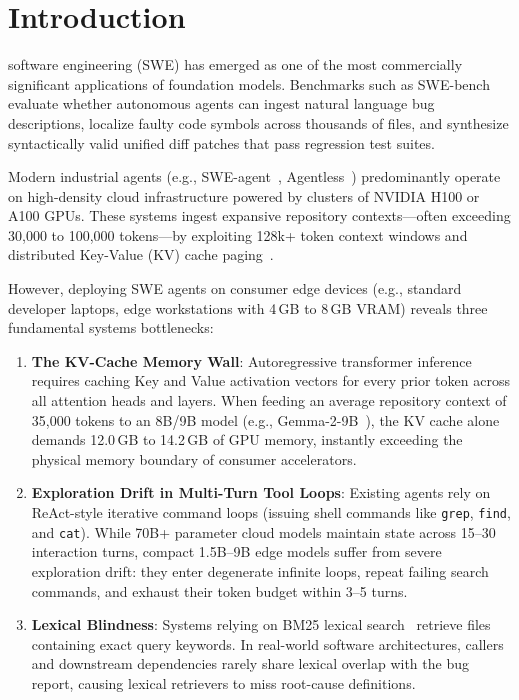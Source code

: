 \documentclass[journal]{IEEEtran}
\begin{document}
\section{Introduction}
\label{sec:intro}

 software engineering (SWE) has emerged as one of the most commercially significant applications of foundation models. Benchmarks such as SWE-bench~\cite{jimenez2024swebench} evaluate whether autonomous agents can ingest natural language bug descriptions, localize faulty code symbols across thousands of files, and synthesize syntactically valid unified diff patches that pass regression test suites.

Modern industrial agents (e.g., SWE-agent~\cite{yang2024sweagent}, Agentless~\cite{xia2024agentless}) predominantly operate on high-density cloud infrastructure powered by clusters of NVIDIA H100 or A100 GPUs. These systems ingest expansive repository contexts---often exceeding 30,000 to 100,000 tokens---by exploiting 128k+ token context windows and distributed Key-Value (KV) cache paging~\cite{kwon2023vllm}.

However, deploying SWE agents on consumer edge devices (e.g., standard developer laptops, edge workstations with 4\,GB to 8\,GB VRAM) reveals three fundamental systems bottlenecks:
\begin{enumerate}
    \item \textbf{The KV-Cache Memory Wall}: Autoregressive transformer inference requires caching Key and Value activation vectors for every prior token across all attention heads and layers. When feeding an average repository context of 35,000 tokens to an 8B/9B model (e.g., Gemma-2-9B~\cite{gemmateam2024gemma2}), the KV cache alone demands 12.0\,GB to 14.2\,GB of GPU memory, instantly exceeding the physical memory boundary of consumer accelerators.
    \item \textbf{Exploration Drift in Multi-Turn Tool Loops}: Existing agents rely on ReAct-style iterative command loops (issuing shell commands like \texttt{grep}, \texttt{find}, and \texttt{cat}). While 70B+ parameter cloud models maintain state across 15--30 interaction turns, compact 1.5B--9B edge models suffer from severe exploration drift: they enter degenerate infinite loops, repeat failing search commands, and exhaust their token budget within 3--5 turns.
    \item \textbf{Lexical Blindness}: Systems relying on BM25 lexical search~\cite{xia2024agentless} retrieve files containing exact query keywords. In real-world software architectures, callers and downstream dependencies rarely share lexical overlap with the bug report, causing lexical retrievers to miss root-cause definitions.
\end{enumerate}
\end{document}
